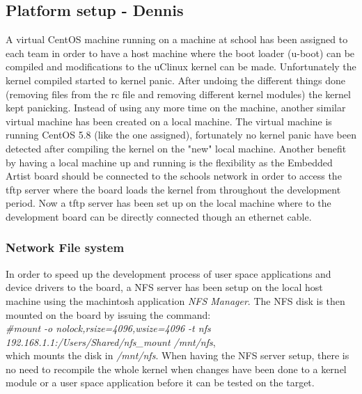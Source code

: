 \subsection{Platform setup - Dennis} 
A virtual CentOS machine running on a machine at school has been assigned to each team in order to have a host machine where the boot loader (u-boot) can be compiled and modifications to the uClinux kernel can be made. Unfortunately the kernel compiled started to kernel panic. After undoing the different things done (removing files from the rc file and removing different kernel modules) the kernel kept panicking. Instead of using any more time on the machine, another similar virtual machine has been created on a local machine. The virtual machine is running CentOS 5.8 (like the one assigned), fortunately no kernel panic have been detected after compiling the kernel on the "new" local machine. Another benefit by having a local machine up and running is the flexibility as the Embedded Artist board should be connected to the schools network in order to access the tftp server where the board loads the kernel from throughout the development period. Now a tftp server has been set up on the local machine where to the development board can be directly connected though an ethernet cable.
\subsubsection{Network File system}
In order to speed up the development process of user space applications and device drivers to the board, a NFS server has been setup on the local host machine using the machintosh application \textit{NFS Manager}. The NFS disk is then mounted on the board by issuing the command: \\\textit{\#mount -o nolock,rsize=4096,wsize=4096 -t nfs 192.168.1.1:/Users/Shared/nfs\_mount /mnt/nfs}, 
\\which mounts the disk in \textit{/mnt/nfs}. When having the NFS server setup, there is no need to recompile the whole kernel when changes have been done to a kernel module or a user space application before it can be tested on the target. 

